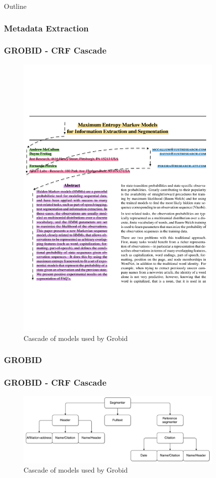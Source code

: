 \documentclass{beamer}
\begin{document}

\begin{frame}[noframenumbering]{Outline}
\end{frame}


\begin{frame}
\frametitle{Metadata Extraction}
\frametitle{GROBID - CRF Cascade}
\begin{figure}[h]
\center
\includegraphics[width=4in]{Figures/extraction.pdf}
\caption{Cascade of models used by Grobid}
\end{figure}
\end{frame}


\begin{frame}
\frametitle{GROBID}
\end{frame}


\begin{frame}
\frametitle{GROBID - CRF Cascade}
\begin{figure}[h]
\center
\includegraphics[width=4in]{Figures/cascade.pdf}
\caption{Cascade of models used by Grobid}
\end{figure}
\end{frame}
\end{document}
